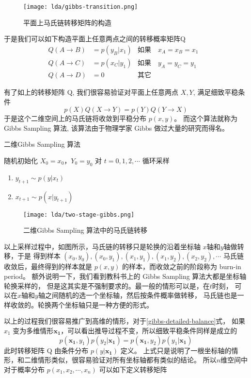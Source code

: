 \begin{figure}[h]
\centering
\texttt{[image: lda/gibbs-transition.png]}
\caption{平面上马氏链转移矩阵的构造}
\end{figure}

于是我们可以如下构造平面上任意两点之间的转移概率矩阵Q
\begin{align*}
Q(A\rightarrow B) & = p(y_B|x_1) & \text{如果} \quad x_A=x_B=x_1 & \\
Q(A\rightarrow C) & = p(x_C|y_1) & \text{如果} \quad y_A=y_C=y_1 & \\
Q(A\rightarrow D) & = 0          & \text{其它} &
\end{align*}


有了如上的转移矩阵 Q, 我们很容易验证对平面上任意两点 $X,Y$, 满足细致平稳条件
$$ p(X)Q(X\rightarrow Y) = p(Y) Q(Y\rightarrow X) $$
于是这个二维空间上的马氏链将收敛到平稳分布 $p(x,y)$。
而这个算法就称为 Gibbs Sampling 算法, 该算法由于物理学家 Gibbs 做过大量的研究而得名。

\begin{algorithm}[htb]
\caption{二维Gibbs Sampling 算法}
\begin{algorithmic}[1]
\STATE 随机初始化 $X_0 = x_0，Y_0=y_0$
\STATE 对 $t=0,1,2,\cdots$ 循环采样
\begin{enumerate}
\item  $y_{t+1} \sim p(y|x_{t})$
\item  $x_{t+1} \sim p(x|y_{t+1})$
\end{enumerate}
\end{algorithmic}
\end{algorithm}
\begin{figure}[htbp]
\centering
\texttt{[image: lda/two-stage-gibbs.png]}
\caption{二维Gibbs Sampling 算法中的马氏链转移}
\end{figure}

以上采样过程中，如图所示，马氏链的转移只是轮换的沿着坐标轴 $x$轴和$y$轴做转移，于是
得到样本 $(x_0,y_0), (x_0,y_1), (x_1,y_1), (x_1,y_2),(x_2,y_2), \cdots $
马氏链收敛后，最终得到的样本就是 $p(x,y)$ 的样本，而收敛之前的阶段称为 burn-in period。
额外说明一下，我们看到教科书上的 Gibbs Sampling 算法大都是坐标轴轮换采样的，
但是这其实是不强制要求的。最一般的情形可以是，在$t$时刻，
可以在$x$轴和$y$轴之间随机的选一个坐标轴，然后按条件概率做转移，
马氏链也是一样收敛的。轮换两个坐标轴只是一种方便的形式。

以上的过程我们很容易推广到高维的情形，对于\eqref{gibbs-detailed-balance}式，
如果$x_1$ 变为多维情形$\mathbf{x_1}$，可以看出推导过程不变，所以细致平稳条件同样是成立的
\begin{equation}
\label{gibbs-detailed-balance-n-dimen}
p(\mathbf{x_1},y_1)p(y_2|\mathbf{x_1}) =  p(\mathbf{x_1},y_2)p(y_1|\mathbf{x_1})
\end{equation}
此时转移矩阵 Q 由条件分布 $p(y|\mathbf{x_1})$ 定义。
上式只是说明了一根坐标轴的情形，和二维情形类似，很容易验证对所有坐标轴都有类似的结论。
所以$n$维空间中对于概率分布 $p(x_1,x_2,\cdots, x_n)$ 可以如下定义转移矩阵

